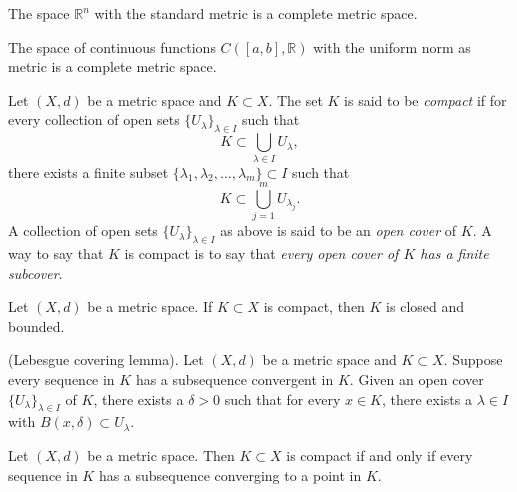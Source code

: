 \documentclass[../main.tex]{subfiles}
\begin{document}
            \begin{proposition} \label{prop:complete_Rn}
            The space \( \mathbb{R}^n \) with the standard metric is a complete metric space.
            \end{proposition}
            
            \begin{proposition} \label{prop:complete_function_space}
            The space of continuous functions \( C([a,b], \mathbb{R}) \) with the uniform norm as metric is a complete metric space.
            \end{proposition}
            
            \begin{definition} \label{def:compact_set}
            Let \( (X, d) \) be a metric space and \( K \subset X \). The set \( K \) is said to be \textit{compact} if for every collection of open sets \( \{ U_{\lambda} \}_{\lambda \in I} \) such that
            \[
            K \subset \bigcup_{\lambda \in I} U_{\lambda},
            \]
            there exists a finite subset \( \{\lambda_1, \lambda_2, \dots, \lambda_m\} \subset I \) such that
            \[
            K \subset \bigcup_{j=1}^{m} U_{\lambda_j}.
            \]
            A collection of open sets \( \{U_{\lambda} \}_{\lambda \in I} \) as above is said to be an \textit{open cover} of \( K \). A way to say that \( K \) is compact is to say that \textit{every open cover of \( K \) has a finite subcover}.
            \end{definition}
            
            \begin{proposition} \label{prop:compact_closed_bounded}
            Let \( (X, d) \) be a metric space. If \( K \subset X \) is compact, then \( K \) is closed and bounded.
            \end{proposition}
            
            \begin{lemma} \label{lem:lebesgue_covering}
            (Lebesgue covering lemma). Let \( (X, d) \) be a metric space and \( K \subset X \). Suppose every sequence in \( K \) has a subsequence convergent in \( K \). Given an open cover \( \{U_{\lambda}\}_{\lambda \in I} \) of \( K \), there exists a \( \delta > 0 \) such that for every \( x \in K \), there exists a \( \lambda \in I \) with \( B(x, \delta) \subset U_{\lambda} \).
            \end{lemma}
            
            \begin{theorem} \label{thm:compactness_sequential}
            Let \( (X, d) \) be a metric space. Then \( K \subset X \) is compact if and only if every sequence in \( K \) has a subsequence converging to a point in \( K \).
            \end{theorem}
            
\end{document}
